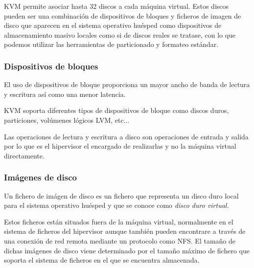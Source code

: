 \documentclass[spanisheDIVcalc,twoside,parskip-,pointlessnumbers,final]{scrbook}
\begin{document}
KVM permite asociar hasta 32 discos a cada máquina virtual. Estos
discos pueden ser una combinación de dispositivos de bloques y ficheros
de imagen de disco que aparecen en el sistema operativo huésped como
dispositivos de almacenamiento masivo locales como si de discos reales
se tratase, con lo que podemos utilizar las herramientas de particionado
y formateo estándar.


\subsubsection*{Dispositivos de bloques}

El uso de dispositivos de bloque proporciona un mayor ancho de banda
de lectura y escritura así como una menor latencia.

KVM soporta diferentes tipos de dispositivos de bloque como discos
duros, particiones, volúmenes lógicos LVM, etc...

Las operaciones de lectura y escritura a disco son operaciones de
entrada y salida por lo que es el hipervisor el encargado de realizarlas
y no la máquina virtual directamente.


\subsubsection*{Imágenes de disco}

Un fichero de imágen de disco es un fichero que representa un disco
duro local para el sistema operativo huésped y que se conoce como
\emph{disco duro virtual.}

Estos ficheros están situados fuera de la máquina virtual, normalmente
en el sistema de ficheros del hipervisor aunque también pueden encontrare
a través de una conexión de red remota mediante un protocolo como
NFS. El tamaño de dichas imágenes de disco viene determinado por el
tamaño máximo de fichero que soporta el sistema de ficheros en el
que se encuentra almacenada.
\end{document}
